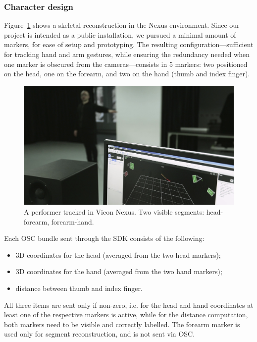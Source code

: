 \documentclass{nime-alternate}
\begin{document}
\subsubsection{Character design}

Figure~\ref{fig:nexus} shows a skeletal reconstruction in the Nexus environment. Since our project is intended as a public installation, we pursued a minimal amount of markers, for ease of setup and prototyping. The resulting configuration---sufficient for tracking hand and arm gestures, while ensuring the redundancy needed when one marker is obscured from the cameras---consists in 5 markers: two positioned on the head, one on the forearm, and two on the hand (thumb and index finger).

\begin{figure}[ht]
	\centering
	\includegraphics[width=\columnwidth, clip, trim={12cm 0 0 0}]{img/nexus}
	\caption{A performer tracked in Vicon Nexus. Two visible segments: head-forearm, forearm-hand.}
	\label{fig:nexus}
\end{figure}

Each OSC bundle sent through the SDK consists of the following:
\begin{itemize}
	\item 3D coordinates for the head (averaged from the two head markers);
	\item 3D coordinates for the hand (averaged from the two hand markers);
	\item distance between thumb and index finger.
\end{itemize}

All three items are sent only if non-zero, i.e. for the head and hand coordinates at least one of the respective markers is active, while for the distance computation, both markers need to be visible and correctly labelled. The forearm marker is used only for segment reconstruction, and is not sent via OSC.
\end{document}
